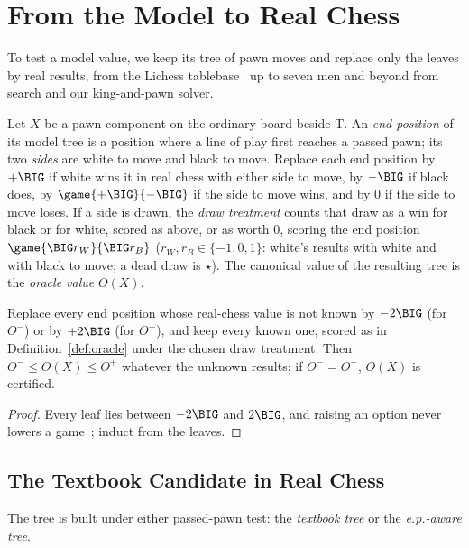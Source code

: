 \section{From the Model to Real Chess}\label{sec:real}

To test a model value, we keep its tree of pawn moves and replace only the leaves by real results, from the
Lichess tablebase~\cite{LichessTB} up to seven men and beyond from search and our king-and-pawn solver.

\begin{definition}\label{def:oracle}
Let $X$ be a pawn component on the ordinary board beside T. An \emph{end position} of its model tree is a
position where a line of play first reaches a passed pawn; its two \emph{sides} are white to move and black to
move. Replace each end position by $+\BIG$ if white wins it in real chess with either side to move, by $-\BIG$
if black does, by $\game{+\BIG}{-\BIG}$ if the side to move wins, and by $0$ if the side to move loses. If a side
is drawn, the \emph{draw treatment} counts that draw as a win for black or for white, scored as above, or as worth $0$, scoring the end position $\game{\BIG r_W}{\BIG r_B}$ ($r_W,r_B\in\{-1,0,1\}$: white's results with white and with
black to move; a dead draw is $\star$). The canonical value of the resulting tree is the \emph{oracle value} $O(X)$.
\end{definition}

\begin{lemma}\label{lem:sandwich}
Replace every end position whose real-chess value is not known by $-2\BIG$ (for $O^-$) or by $+2\BIG$ (for
$O^+$), and keep every known one, scored as in Definition~\ref{def:oracle} under the chosen draw treatment. Then
$O^-\le O(X)\le O^+$ whatever the unknown results; if $O^-=O^+$, $O(X)$ is certified.
\end{lemma}
\begin{proof}
Every leaf lies between $-2\BIG$ and $2\BIG$, and raising an option never lowers a
game~\cite{Siegel2013}; induct from the leaves.
\end{proof}

\subsection{The Textbook Candidate in Real Chess}\label{sec:real-cand}

The tree is built under either passed-pawn test: the \emph{textbook tree} or the \emph{e.p.-aware tree}.


